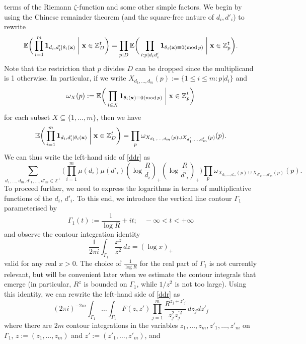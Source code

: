 \documentclass[12pt,a4paper,reqno]{amsart}
\numberwithin{equation}{section}
\theoremstyle{plain}
\theoremstyle{definition}
\renewcommand{\leq}{\leqslant}
\newcommand{\mdsub}[1]{\ensuremath{(\mbox{\scriptsize mod}\, #1)}}
\def\Z{{\mathbb Z}}
\def\E{{\mathbb E}}
\def\x{{\bf x}}
\begin{document}
terms of the Riemann $\zeta$-function and some other simple factors.
We begin by using the Chinese remainder theorem (and the square-free nature of
$d_i, d'_i$) to rewrite
$$ \E\bigg( \prod_{i=1}^m {\bf 1}_{d_i, d'_i | \theta_i(\x)} \; \bigg| \; \x \in \Z_D^t \bigg)
= \prod_{p|D} \E\bigg( \prod_{i: p | d_i d'_i} {\bf 1}_{\theta_i(\x) \equiv 0 \mdsub{p}} \; \bigg| \; \x \in \Z_p^t \bigg).$$
Note that the restriction that $p$ divides $D$ can be dropped since the multiplicand is 1 otherwise.
In particular, if we write $X_{d_1,\ldots,d_m}(p) := \{ 1 \leq i \leq m: p | d_i \}$ and
\begin{equation}\label{omega-def}
\omega_X(p) := \E\bigg( \prod_{i \in X} {\bf 1}_{\theta_i(\x) \equiv 0 \mdsub{p}} \; \bigg| \; \x \in \Z_p^t \bigg)
\end{equation} for each
subset $X \subseteq\{1,\ldots,m\}$, then we have
$$ \E\bigg( \prod_{i=1}^m {\bf 1}_{d_i, d'_i | \theta_i(\x)} \; \bigg| \; \x \in \Z_D^t \bigg)
= \prod_p \omega_{X_{d_1,\ldots,d_m}(p) \cup X_{d'_1,\ldots,d'_m}(p)}(p).$$
We can thus write the left-hand side of \eqref{ddr} as
\[ \sum_{d_1,\ldots,d_m,d'_1,\ldots,d'_m \in \Z^+}
\bigg(\prod_{i=1}^m \mu(d_i) \mu(d'_i) (\log \frac{R}{d_i})_+ (\log \frac{R}{d'_i})_+\bigg)
\prod_p \omega_{X_{d_1,\ldots,d_m}(p) \cup X_{d'_1,\ldots,d'_m}(p)}(p).\]
To proceed further, we need to express the logarithms in terms of multiplicative functions of the $d_i$, $d'_i$.  To
this end, we introduce the vertical line contour $\Gamma_1$ parameterised by
\begin{equation}\label{gamma1-def}
\Gamma_1(t) := \frac{1}{\log R} + it; \quad -\infty < t < +\infty
\end{equation}
and observe the contour integration identity
$$ \frac{1}{2\pi i} \int_{\Gamma_1} \frac{x^z}{z^2} \, dz = (\log x)_+$$
valid for any real $x > 0$.
The choice of $\frac{1}{\log R}$ for the real part of $\Gamma_1$ is not currently relevant, but will be convenient later
when we estimate the contour integrals that emerge (in particular, $R^z$ is bounded on $\Gamma_1$, while $1/z^2$ is not too large).
Using this identity, we can rewrite the left-hand side of \eqref{ddr} as
\begin{equation}\label{T-exp} (2\pi i)^{-2m}\int_{\Gamma_1} \dots \int_{\Gamma_1} 
F(z,z') \prod_{j = 1}^m \frac{R^{z_j + z'_j}}{z_j^2z^{\prime 2}_j} \, dz_jdz'_j
\end{equation} 
where there are $2m$ contour integrations in the variables $z_1, \ldots, z_m, z'_1, \ldots, z'_m$ on $\Gamma_1$,
$z := (z_1,\ldots,z_m)$ and $z' := (z'_1,\ldots,z'_m)$, and
\end{document}
